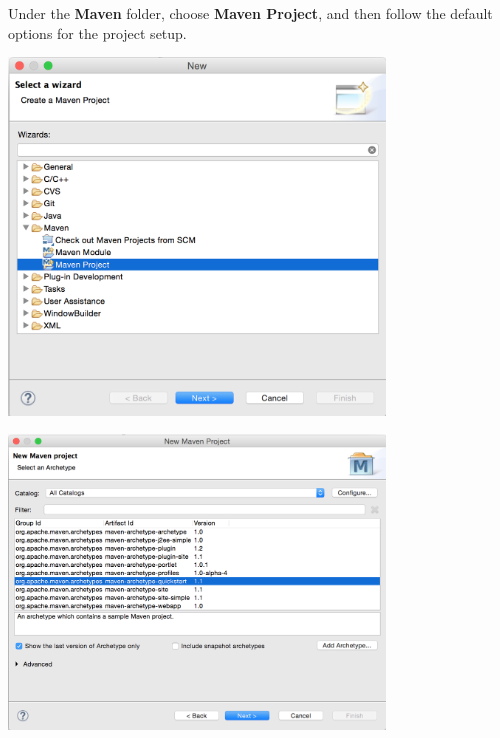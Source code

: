Under the {\bf Maven} folder, choose {\bf Maven Project}, and then follow the default options for the project setup.
\begin{center}
  \includegraphics[width=0.75\textwidth]{figures/createNewMavenProject2}
\end{center}


\begin{center}
  \includegraphics[width=0.75\textwidth]{figures/createNewMavenProject4}
\end{center}

